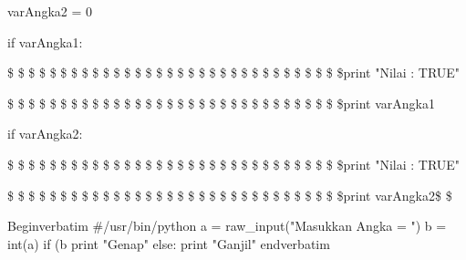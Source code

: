 \noindent 
varAngka2 = 0 \par
\vspace{12pt}
\noindent 
if varAngka1: \par
\vspace{12pt}
\noindent 
 \$  \$ \$  \$ \$  \$ \$  \$ \$ \$ \$  \$ \$  \$ \$  \$ \$  \$ \$  \$ \$  \$ \$  \$ \$  \$ \$  \$ \$  \$ \$  \$print "Nilai : TRUE" \par
\vspace{12pt}
\noindent 
 \$  \$ \$  \$ \$  \$ \$  \$ \$  \$ \$  \$ \$  \$ \$  \$ \$  \$ \$  \$ \$  \$ \$  \$ \$  \$ \$  \$ \$  \$ \$  \$print varAngka1 \par
\vspace{12pt}
\noindent 
if varAngka2: \par
\vspace{12pt}
\noindent 
 \$  \$ \$  \$ \$  \$ \$  \$ \$ \$ \$  \$ \$  \$ \$  \$ \$  \$ \$  \$ \$  \$ \$  \$ \$  \$ \$  \$ \$  \$ \$  \$print "Nilai : TRUE" \par
\vspace{12pt}
\noindent 
 \$  \$ \$  \$ \$  \$ \$  \$ \$ \$ \$  \$ \$  \$ \$  \$ \$  \$ \$  \$ \$  \$ \$  \$ \$  \$ \$  \$ \$  \$ \$  \$print varAngka2{\fontsize{14pt}{14pt}\selectfont  \$  \$ \\} \par
\vspace{12pt}
\noindent 
Begin{verbatim}
#/usr/bin/python
a = raw_input("Masukkan Angka = ")
b = int(a)
if (b%
        print "Genap"
else:
        print "Ganjil"
end{verbatim}


